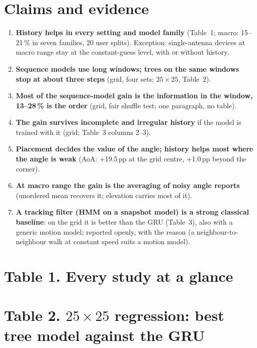 \documentclass[10pt]{article}
\begin{document}
\section*{Claims and evidence}
\begin{enumerate}
\item \textbf{History helps in every setting and model family} (Table~1; macro: 15--21\,\% in seven families, 20 user splits). Exception: single-antenna devices at macro range stay at the constant-guess level, with or without history.
\item \textbf{Sequence models use long windows; trees on the same windows stop at about three steps} (grid, four sets; $25\times25$, Table~2).
\item \textbf{Most of the sequence-model gain is the information in the window, 13--28\,\% is the order} (grid, fair shuffle test; one paragraph, no table).
\item \textbf{The gain survives incomplete and irregular history} if the model is trained with it (grid; Table~3 columns 2--3).
\item \textbf{Placement decides the value of the angle; history helps most where the angle is weak} (AoA: +19.5\,pp at the grid centre, +1.0\,pp beyond the corner).
\item \textbf{At macro range the gain is the averaging of noisy angle reports} (unordered mean recovers it; elevation carries most of it).
\item \textbf{A tracking filter (HMM on a snapshot model) is a strong classical baseline}: on the grid it is better than the GRU (Table~3), also with a generic motion model; reported openly, with the reason (a neighbour-to-neighbour walk at constant speed suits a motion model).
\end{enumerate}

\section*{Table 1. Every study at a glance}
\begin{center}\small\resizebox{\textwidth}{!}{}\end{center}
\vspace{-6pt}{\footnotesize Mean position error of the best model without history and with history (any depth tested), against always guessing the mean position.}

\section*{Table 2. $25\times25$ regression: best tree model against the GRU}
\begin{center}\small\resizebox{\textwidth}{!}{}\end{center}
\end{document}
